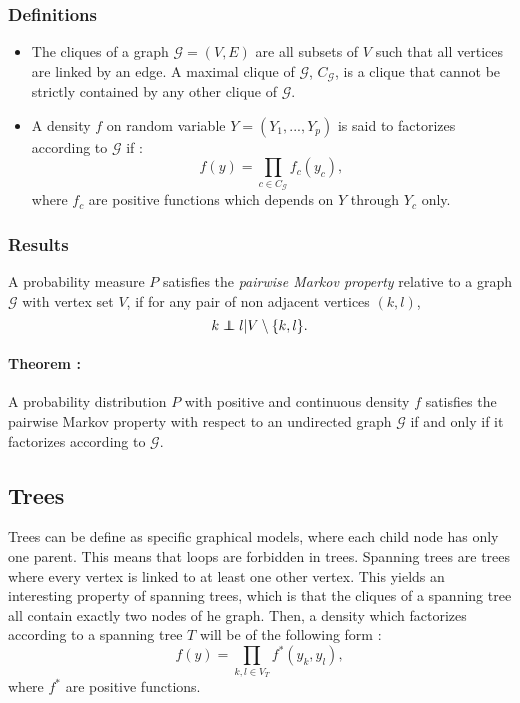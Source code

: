 \documentclass[a4paper,11pt]{article}
\newcommand\independent{\protect\mathpalette{\protect\independenT}{\perp}}
\def\independenT#1#2{\mathrel{\rlap{$#1#2$}\mkern2mu{#1#2}}}
\begin{document}
  \subsubsection{Definitions}
  \begin{itemize}
  \item The cliques of a graph $\mathcal{G}=(V,E)$ are all subsets of $V$ such that all vertices are linked by an edge. A maximal clique of $\mathcal{G}$,
  $C_\mathcal{G}$, is a clique that cannot be strictly contained by any other clique of $\mathcal{G}$.\\
  \item A density $f$ on random variable $Y=(Y_1,...,Y_p)$ is said to factorizes according to $\mathcal{G}$ if :
  \[f(y)= \prod_{c\in C_\mathcal{G}} f_c(y_c),\]
  where $f_c$ are positive functions which depends on $Y$ through $Y_c$ only.
  \end{itemize}
  \subsubsection{Results}
  A probability measure $P$ satisfies the \textit{pairwise Markov property} relative to a graph $\mathcal{G}$ with vertex set $V$,
  if for any pair of non adjacent vertices $(k,l)$,
  \[k \independent l|V\setminus\{k,l\}.\]
  
  \paragraph{Theorem  \cite{ham}:} A probability distribution $P$ with positive and continuous density $f$ satisfies
  the pairwise Markov property with respect to an undirected graph $\mathcal{G}$ if and only if it factorizes according to $\mathcal{G}$.
  
  
  \subsection{Trees}
  Trees can be define as specific graphical models, where each child node has only one parent. This means that loops are forbidden in trees.
  Spanning trees are trees where every vertex is linked to at least one other vertex. This yields an interesting property of spanning trees, which 
  is that the cliques of a spanning tree all contain exactly two nodes of he graph. Then, a density which factorizes according to a spanning
  tree $T$ will be of the following form :
  \[f(y)= \prod_{k,l\in V_T} f^*(y_k,y_l),\]
  where $f^*$ are positive functions.
  
\end{document}
